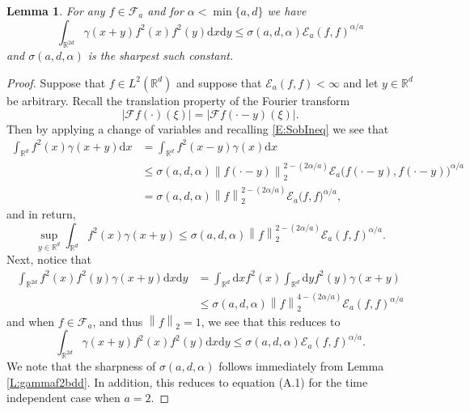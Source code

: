 \documentclass[12pt]{report}
\theoremstyle{plain}
\newtheorem{lemma}[theorem]{Lemma}
\theoremstyle{definition}
\numberwithin{equation}{section}
\newcommand{\R}{\mathbb{R}}
\newcommand{\Norm}[1]{\left\|  #1   \right\|}
\newcommand{\ud}{\ensuremath{ \mathrm{d} }}
\begin{document}
\begin{lemma} \label{L:gammaf2f2bdd}
	For any $f \in \mathcal{F}_a$ and for $\alpha < \min\{a,d\}$ we have
	\begin{equation} \label{E:sobineq1}
	\int_{\R^{2d}} \gamma(x+y)f^2(x)f^2(y) \ud x \ud y \le \sigma(a,d,\alpha) \mathcal{E}_a(f,f)^{\alpha/a}
	\end{equation}
	and $\sigma(a,d,\alpha)$ is the sharpest such constant.
\end{lemma}
\begin{proof}
	Suppose that $f \in L^2(\R^d)$ and suppose that $\mathcal{E}_a(f,f) < \infty$ and let $y\in \R^d$
	be arbitrary. Recall the translation property of the Fourier transform
	\[
	|\mathcal{F}f(\cdot)(\xi)|  = |\mathcal{F}f(\cdot-y)(\xi)|.
	\]
	Then by applying a change of variables and recalling \eqref{E:SobIneq} we see that
	\begin{align*}
	\int_{\R^d} f^2(x) \gamma(x+y)\ud x &= \int_{\R^d} f^2(x-y) \gamma(x)\ud x\\
	& \le \sigma(a,d,\alpha) \Norm{f(\cdot-y)}_2^{2-(2\alpha/a)}\mathcal{E}_a\big(f(\cdot-y),f(\cdot-y)\big)^{\alpha/a} \\
	& = \sigma(a,d,\alpha) \Norm{f}_2^{2-(2\alpha/a)}\mathcal{E}_a\big(f,f\big)^{\alpha/a}, 
	\end{align*}
	and in return,
	\[
	\sup_{y\in \R^d} \int_{\R^d} f^2(x) \gamma(x+y) \le \sigma(a,d,\alpha)     \Norm{f}_2^{2-(2\alpha/a)}\mathcal{E}_a(f,f)^{\alpha/a}.
	\]
	Next, notice that
	\begin{align*}
	\int_{\R^{2d}} f^2(x)f^2(y) \gamma(x+y) \ud x \ud y
	& = \int_{\R^d} \ud x f^2(x) \int_{\R^d} \ud y f^2(y)\gamma(x+y) \\
	& \le \sigma(a,d,\alpha) \Norm{f}_2^{4-(2\alpha/a)}\mathcal{E}_a(f,f)^{\alpha/a}
	\end{align*}
	and when $f \in \mathcal{F}_a$, and thus $\Norm{f}_2 = 1$, we see that this reduces to
	\[
	\int_{\R^{2d}} \gamma(x+y)f^2(x)f^2(y) \ud x \ud y \le \sigma(a,d,\alpha) \mathcal{E}_a(f,f)^{\alpha/a}.
	\]
	We note that the sharpness of $\sigma(a,d,\alpha)$ follows immediately from Lemma
	\ref{L:gammaf2bdd}. In addition, this reduces to equation (A.1) \cite{chen.hu.ea:15:exponential} for the time
	independent case when $a=2$.
\end{proof}
\end{document}

